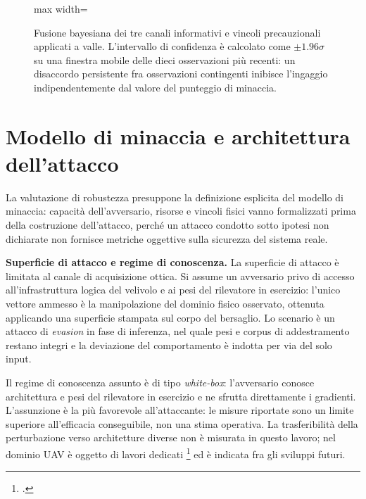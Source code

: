 \documentclass[a4paper,12pt]{report}
\begin{document}
\begin{figure}[htbp]
\begin{adjustbox}{max width=\textwidth}
\end{adjustbox}
\caption[Fusione bayesiana dei tre canali e vincoli precauzionali]{Fusione
bayesiana dei tre canali informativi e vincoli precauzionali applicati a valle.
L'intervallo di confidenza è calcolato come $\pm 1.96\sigma$ su una finestra
mobile delle dieci osservazioni più recenti: un disaccordo persistente fra
osservazioni contingenti inibisce l'ingaggio indipendentemente dal valore del
punteggio di minaccia.}
\label{fig:fusione_decisione}
\end{figure}

\section{Modello di minaccia e architettura dell'attacco}
\label{sec:attacco}

La valutazione di robustezza presuppone la definizione esplicita del modello di
minaccia: capacità dell'avversario, risorse e vincoli fisici vanno formalizzati
prima della costruzione dell'attacco, perché un attacco condotto sotto ipotesi
non dichiarate non fornisce metriche oggettive sulla sicurezza del sistema
reale.

\textbf{Superficie di attacco e regime di conoscenza.}
\label{sec:threat_model}
La superficie di attacco è limitata al canale di acquisizione ottica. Si assume
un avversario privo di accesso all'infrastruttura logica del velivolo e ai pesi
del rilevatore in esercizio: l'unico vettore ammesso è la manipolazione del
dominio fisico osservato, ottenuta applicando una superficie stampata sul corpo
del bersaglio. Lo scenario è un attacco di \textit{evasion} in fase di
inferenza, nel quale pesi e corpus di addestramento restano integri e la
deviazione del comportamento è indotta per via del solo input.

Il regime di conoscenza assunto è di tipo \textit{white-box}: l'avversario
conosce architettura e pesi del rilevatore in esercizio e ne sfrutta
direttamente i gradienti. L'assunzione è la più favorevole all'attaccante:
le misure riportate sono un limite superiore all'efficacia conseguibile, non
una stima operativa. La trasferibilità della perturbazione verso architetture
diverse non è misurata in questo lavoro; nel dominio UAV è oggetto di lavori
dedicati \footcite{shrestha_2023} ed è indicata fra gli sviluppi futuri.
\end{document}
